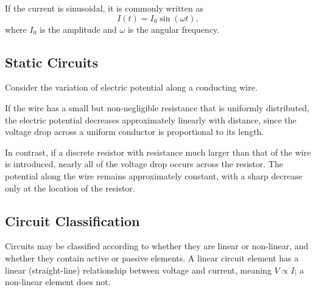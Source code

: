 \documentclass{article}
\begin{document}
If the current is sinusoidal, it is commonly written as
\[I(t) = I_0\sin(\omega t),\]
where $I_0$ is the amplitude and $\omega$ is the angular frequency.

\subsection{Static Circuits}

Consider the variation of electric potential along a conducting wire.

If the wire has a small but non-negligible resistance that is uniformly distributed, the electric potential decreases approximately linearly with distance, since the voltage drop across a uniform conductor is proportional to its length.
\begin{center}
\end{center}

In contrast, if a discrete resistor with resistance much larger than that of the wire is introduced, nearly all of the voltage drop occurs across the resistor. The potential along the wire remains approximately constant, with a sharp decrease only at the location of the resistor.
\begin{center}
\end{center}

\subsection{Circuit Classification}

Circuits may be classified according to whether they are linear or non-linear, and whether they contain active or passive elements. A linear circuit element has a linear (straight-line) relationship between voltage and current, meaning $V \propto I$; a non-linear element does not.
\end{document}
